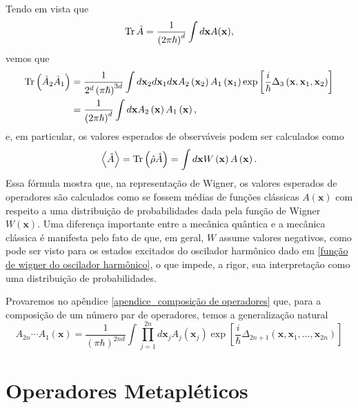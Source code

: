 \documentclass[
	12pt,
	oneside,			%
	a4paper,			%
	english,			%
	brazil				%
	]{abntex2}
\theoremstyle{definition}
\begin{document}
Tendo em vista que
\begin{equation}
\label{traço wigner}
    \Tr \hat{A} = \frac{1}{\left(2 \pi \hbar\right)^d} \int d \mathbf{x} A(\mathbf{x}),
\end{equation}
vemos que
\begin{equation}
    \begin{aligned}
        \Tr \left(\hat{A}_2 \hat{A}_1\right) &= \frac{1}{2^d\left(\pi \hbar\right)^{3d}} \int d \mathbf{x}_2 d \mathbf{x}_1 d\mathbf{x} A_2\left(\mathbf{x}_2\right) A_1\left(\mathbf{x}_1\right) \exp\left[\frac{i}{\hbar}\Delta_3 \left(\mathbf{x},\mathbf{x}_1,\mathbf{x}_2\right)\right] \\
        &= \frac{1}{\left( 2\pi \hbar \right)^d} \int d\mathbf{x} A_2\left(\mathbf{x}\right) A_1\left(\mathbf{x}\right),
    \end{aligned}
\end{equation}
e, em particular, os valores esperados de observáveis podem ser calculados como
\begin{equation}
\label{valor esperado wigner}
    \ev{\hat{A}} = \Tr \left(\hat{\rho} \hat{A}\right) =  \int d\mathbf{x} W\left(\mathbf{x}\right) A\left(\mathbf{x}\right) .
\end{equation}
Essa fórmula mostra que, na representação de Wigner, os valores esperados de operadores são calculados como se fossem médias de funções clássicas $A(\mathbf{x})$ com respeito a uma distribuição de probabilidades dada pela função de Wigner $W(\mathbf{x})$. Uma diferença importante entre a mecânica quântica e a mecânica clássica é manifesta pelo fato de que, em geral, $W$ assume valores negativos, como pode ser visto para os estados excitados do oscilador harmônico dado em \eqref{função de wigner do oscilador harmônico}, o que impede, a rigor, sua interpretação como uma distribuição de probabilidades.

Provaremos no apêndice \ref{apendice_composição de operadores} que, para a composição de um número par de operadores, temos a generalização natural
\begin{equation}
\label{composição na representação de wigner}
    A_{2n} \cdots A_1 \left(\mathbf{x}\right) = \frac{1}{\left(\pi \hbar\right)^{2nd}} \int  \prod_{j=1}^{2n} d\mathbf{x}_j A_j\left(\mathbf{x}_j\right) \exp\left[\frac{i}{\hbar}\Delta_{2n+1} \left(\mathbf{x},\mathbf{x}_1,\ldots,\mathbf{x}_{2n}\right)\right]
\end{equation}

\section{Operadores Metapléticos}
\end{document}
